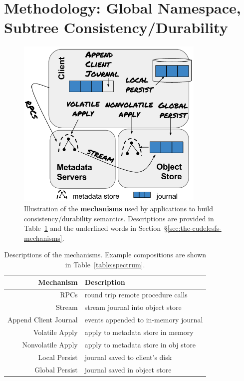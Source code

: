 \section{Methodology: Global Namespace, Subtree Consistency/Durability}
\label{sec:methodology-decoupled-namespaces}

\begin{figure}[tb]
\centering
\includegraphics[width=90mm]{figures/fig-decouple.png}
\caption{Illustration of the \textbf{mechanisms} used by applications to build
consistency/durability semantics. Descriptions are provided in
Table~\ref{table:mechanisms} and the underlined words in
Section~\S\ref{sec:the-cudelesfs-mechanisms}.}\label{fig:decouple}
\end{figure}

\begin{table}
\begin{tabular}{ r | l }
  Mechanism         & Description \\\hline
  RPCs              & round trip remote procedure calls \\
  Stream            & stream journal into object store \\
  Append Client Journal & events appended to in-memory journal \\
  Volatile Apply & apply to metadata store in memory \\
  Nonvolatile Apply    & apply to metadata store in obj store \\
  Local Persist     & journal saved to client's disk \\
  Global Persist    & journal saved in object store \\
\end{tabular}
\caption{Descriptions of the mechanisms. Example compositions are shown in Table~\ref{table:spectrum}.\label{table:mechanisms}} 
\end{table}

